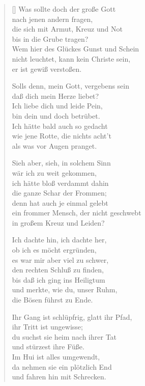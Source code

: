 \begin{multicols}{2}
\begin{verse}[\versewidth]
 Was sollte doch der große Gott\\
nach jenen andern fragen,\\
die sich mit Armut, Kreuz und Not\\
bis in die Grube tragen?\\
Wem hier des Glückes Gunst und Schein\\
nicht leuchtet, kann kein Christe sein,\\
er ist gewiß verstoßen.

 Solls denn, mein Gott, vergebens sein\\
daß dich mein Herze liebet?\\
Ich liebe dich und leide Pein,\\
bin dein und doch betrübet.\\
Ich hätte bald auch so gedacht\\
wie jene Rotte, die nichts acht't\\
als was vor Augen pranget.

 Sieh aber, sieh, in solchem Sinn\\
wär ich zu weit gekommen,\\
ich hätte bloß verdammt dahin\\
die ganze Schar der Frommen;\\
denn hat auch je einmal gelebt\\
ein frommer Mensch, der nicht geschwebt\\
in großem Kreuz und Leiden?

 Ich dachte hin, ich dachte her,\\
ob ich es möcht ergründen,\\
es war mir aber viel zu schwer,\\
den rechten Schluß zu finden,\\
bis daß ich ging ins Heiligtum\\
und merkte, wie du, unser Ruhm,\\
die Bösen führst zu Ende.

 Ihr Gang ist schlüpfrig, glatt ihr Pfad,\\
ihr Tritt ist ungewisse;\\
du suchst sie heim nach ihrer Tat\\
und stürzest ihre Füße.\\
Im Hui ist alles umgewendt,\\
da nehmen sie ein plötzlich End\\
und fahren hin mit Schrecken.


\end{verse}
\end{multicols}
